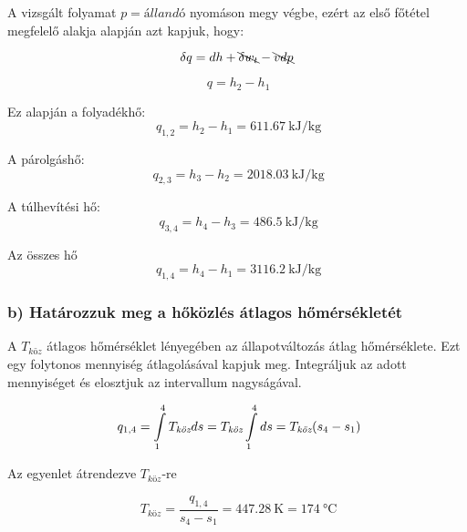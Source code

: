 A vizsgált folyamat $p = {\textit{állandó}}$ nyomáson megy végbe, ezért az első főtétel megfelelő alakja alapján  azt kapjuk, hogy:

\begin{equation}
\delta q = dh + \bcancel{\delta w_t}-\bcancel{vdp}
\end{equation}

\begin{equation}
\ q = h_2-h_1
\end{equation}

Ez alapján a folyadékhő:
\begin{equation}
\ q_{1,2} = h_2-h_1 = \SI{611,67}{\kilo\joule\per\kilogram}
\end{equation}

A párolgáshő:
\begin{equation}
\ q_{2,3} = h_3-h_2 = \SI{2018,03}{\kilo\joule\per\kilogram}
\end{equation}

A túlhevítési hő:
\begin{equation}
\ q_{3,4} = h_4-h_3 = \SI{486,5}{\kilo\joule\per\kilogram}
\end{equation}

Az összes hő
\begin{equation}
\ q_{1,4} = h_4-h_1 = \SI{3116,2}{\kilo\joule\per\kilogram}
\end{equation}

\subsubsection*{b) Határozzuk meg a hőközlés átlagos hőmérsékletét}

A $T_{\textit{köz}}$ átlagos hőmérséklet lényegében az állapotváltozás átlag hőmérséklete. Ezt egy folytonos mennyiség átlagolásával kapjuk meg. Integráljuk az adott mennyiséget és elosztjuk az intervallum nagyságával. 

\begin{equation*}
\ q_{1,4} = \int\displaylimits_{1}^{4} T_{\textit{köz}} ds = T_{\textit{köz}} \int\displaylimits_{1}^{4} ds = T_{\textit{köz}} (s_4-s_1)
\end{equation*}

Az egyenlet átrendezve $T_{\textit{köz}}$-re

\begin{equation}
\ T_{\textit{köz}} = \frac{q_{1,4}}{s_4-s_1} = \SI{447,28}{\kelvin} = \SI{174}{\celsius}
\end{equation}

